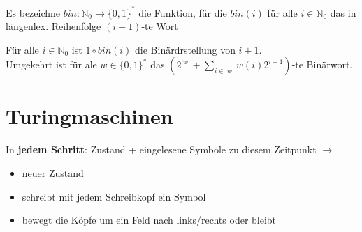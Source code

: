 \begin{bem}
    Es bezeichne $bin:\mathbb{N}_0 \rightarrow \{0,1\}^*$ die Funktion, für die $bin(i)$ für alle $i \in \mathbb{N}_0$ das in längenlex. Reihenfolge $(i+1)$-te Wort
\end{bem}

\begin{bem}
    Für alle $i \in \mathbb{N}_0$ ist $1 \circ bin(i)$ die Binärdrstellung von $i+1$. \\
    Umgekehrt ist für ale $w \in \{0,1\}^*$ das $(2^{|w|} + \sum_{i \in |w|}w(i)2^{i-1})$-te Binärwort.
\end{bem}

\section{Turingmaschinen}

In \textbf{jedem Schritt}: 
Zustand + eingelesene Symbole zu diesem Zeitpunkt $\rightarrow$
\begin{itemize}
    \item neuer Zustand
    \item schreibt mit jedem Schreibkopf ein Symbol
    \item bewegt die Köpfe um ein Feld nach links/rechts oder bleibt
\end{itemize}

